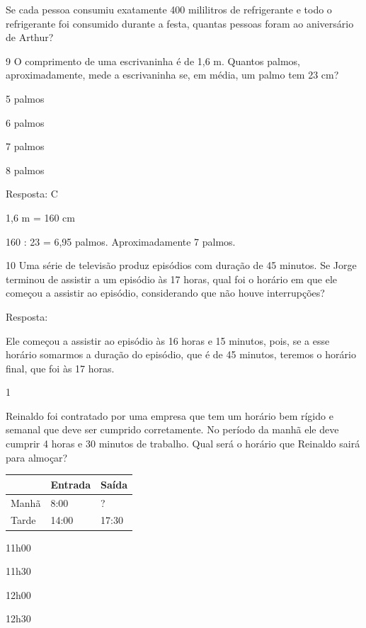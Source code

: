 \begin{escolha}
\begin{escolha}
\item
  Se cada pessoa consumiu exatamente 400 mililitros de refrigerante e
  todo o refrigerante foi consumido durante a festa, quantas pessoas
  foram ao aniversário de Arthur?

\end{escolha}

\num{9} O comprimento de uma escrivaninha é de 1,6 m. Quantos palmos,
aproximadamente, mede a escrivaninha se, em média, um palmo tem 23 cm?

\begin{escolha}

\item
  5 palmos
\item
  6 palmos
\item
  7 palmos
\item
  8 palmos
\end{escolha}

Resposta: C

1,6 m = 160 cm

160 : 23 = 6,95 palmos. Aproximadamente 7 palmos.

\num{10} Uma série de televisão produz episódios com duração de 45 minutos.
Se Jorge terminou de assistir a um episódio às 17 horas, qual foi o
horário em que ele começou a assistir ao episódio, considerando que não houve interrupções?


Resposta:

Ele começou a assistir ao episódio às 16 horas e 15 minutos, pois, se a esse
horário somarmos a duração do episódio, que é de 45 minutos, teremos o
horário final, que foi às 17 horas.


\num{1}

Reinaldo foi contratado por uma empresa que tem um horário bem rígido
e semanal que deve ser cumprido corretamente. No período da manhã ele deve
cumprir 4 horas e 30 minutos de trabalho. Qual será o horário que
Reinaldo sairá para almoçar?

\begin{longtable}[]{@{}lll@{}}
\toprule
& Entrada & Saída\tabularnewline
\midrule
\endhead
Manhã & 8:00 & ?\tabularnewline
Tarde & 14:00 & 17:30\tabularnewline
\bottomrule
\end{longtable}

\begin{escolha}
\item
  11h00
\item
  11h30
\item
  12h00
\item
  12h30
\end{escolha}


\end{escolha}
